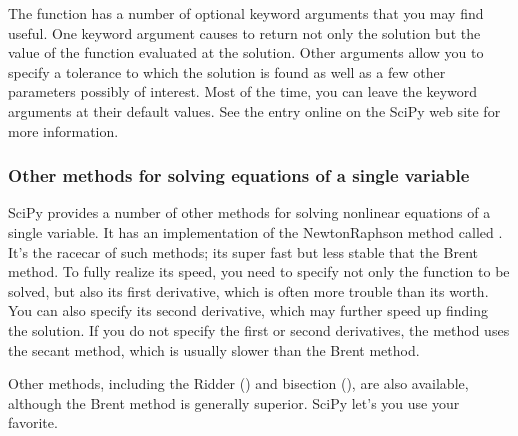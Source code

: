 \documentclass[letterpaper,10pt,english]{sphinxmanual}
\begin{document}
\sphinxAtStartPar
The  function has a number of optional keyword arguments that you may find useful.  One keyword argument causes  to return not only the solution but the value of the function evaluated at the solution.  Other arguments allow you to specify a tolerance to which the solution is found as well as a few other parameters possibly of interest.  Most of the time, you can leave the keyword arguments at their default values.  See the  entry online on the SciPy web site for more information.

\ignorespaces 

\subsubsection{Other methods for solving equations of a single variable}
\label{\detokenize{chap9/chap9_scipy:other-methods-for-solving-equations-of-a-single-variable}}\label{\detokenize{chap9/chap9_scipy:index-13}}
\sphinxAtStartPar
SciPy provides a number of other methods for solving nonlinear equations of a single variable.  It has an implementation of the Newton\sphinxhyphen{}Raphson method called .  It’s the racecar of such methods; its super fast but less stable that the Brent method.  To fully realize its speed, you need to specify not only the function to be solved, but also its first derivative, which is often more trouble than its worth.  You can also specify its second derivative, which may further speed up finding the solution.  If you do not specify the first or second derivatives, the method uses the secant method, which is usually slower than the Brent method.

\ignorespaces 
\sphinxAtStartPar
Other methods, including the Ridder () and bisection (), are also available, although the Brent method is generally superior.  SciPy let’s you use your favorite.
\end{document}
